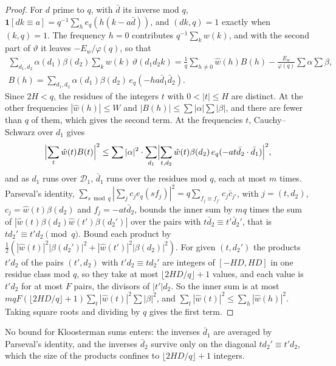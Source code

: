 \documentclass[11pt]{article}
\theoremstyle{definition}
\begin{document}
\begin{proof}
For $d$ prime to $q$, with $\bar d$ its inverse mod $q$, $\mathbf 1[dk \equiv a] = q^{-1} \sum_h e_q(h(k - a\bar d))$,
and
$(dk, q) = 1$ exactly when $(k, q) = 1$. The frequency $h = 0$ contributes $q^{-1} \sum_k w(k)$, and with the second
part of $\vartheta$ it leaves $-E_w/\varphi(q)$, so that
\begin{gather*}
  \sum_{d_1, d_2} \alpha(d_1)\beta(d_2) \sum_k w(k)\, \vartheta(d_1 d_2 k)
  = \frac1q \sum_{h \ne 0} \hat w(h) B(h) - \frac{E_w}{\varphi(q)} \sum \alpha \sum \beta, \\
  B(h) = \sum_{d_1, d_2} \alpha(d_1) \beta(d_2)\, e_q(-ha \bar d_1 \bar d_2).
\end{gather*}
Since $2H < q$, the residues of the integers $t$ with $0 < |t| \le H$ are distinct. At the other frequencies
$|\hat w(h)| \le W$ and $|B(h)| \le \sum |\alpha| \sum |\beta|$, and there are fewer than $q$ of them, which gives the
second term. At the frequencies $t$, Cauchy--Schwarz over $d_1$ gives
\[
  \Bigl|\sum_t \hat w(t) B(t)\Bigr|^2 \le \sum |\alpha|^2 \cdot
  \sum_{d_1} \Bigl|\sum_{t, d_2} \hat w(t) \beta(d_2)\, e_q(-a t \bar d_2 \cdot \bar d_1)\Bigr|^2,
\]
and as $d_1$ runs over $\mathcal D_1$, $\bar d_1$ runs over the residues mod $q$, each at most $m$ times. Parseval's
identity, $\sum_{s \bmod q} |\sum_j c_j e_q(s f_j)|^2 = q \sum_{f_j \equiv f_{j'}} c_j \bar c_{j'}$, with $j = (t,
d_2)$,
$c_j = \hat w(t)\beta(d_2)$ and $f_j = -at\bar d_2$, bounds the inner sum by $mq$ times the sum of
$|\hat w(t)\beta(d_2)\hat w(t')\beta(d_2')|$ over the pairs with $t \bar d_2 \equiv t' \bar d_2'$, that is
$t d_2' \equiv t' d_2 \pmod q$. Bound each product by $\tfrac12(|\hat w(t)|^2 |\beta(d_2')|^2 + |\hat w(t')|^2
|\beta(d_2)|^2)$. For given $(t, d_2')$ the products $t' d_2$ of the pairs $(t', d_2)$ with $t' d_2 \equiv t d_2'$ are
integers of $[-HD, HD]$ in one residue class mod $q$, so they take at most $\lfloor 2HD/q \rfloor + 1$ values, and each
value is $t' d_2$ for at most $F$ pairs, the divisors of $|t'| d_2$. So the inner sum is at most
$mqF(\lfloor 2HD/q \rfloor + 1) \sum_t |\hat w(t)|^2 \sum |\beta|^2$, and $\sum_t |\hat w(t)|^2 \le \sum_h |\hat
w(h)|^2$. Taking square roots and dividing by $q$ gives the first term.
\end{proof}

No bound for Kloosterman sums enters: the inverses $\bar d_1$ are averaged by Parseval's identity, and the inverses
$\bar d_2$ survive only on the diagonal $t d_2' \equiv t' d_2$, which the size of the products confines to
$\lfloor 2HD/q \rfloor + 1$ integers.
\end{document}
